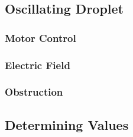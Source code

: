 \documentclass{physics_article_B}
\begin{document}
	\subsection{Oscillating Droplet}

		\subsubsection{Motor Control}

		\subsubsection{Electric Field}

		\subsubsection{Obstruction}

	\subsection{Determining Values}

\newpage



    

\end{document}
